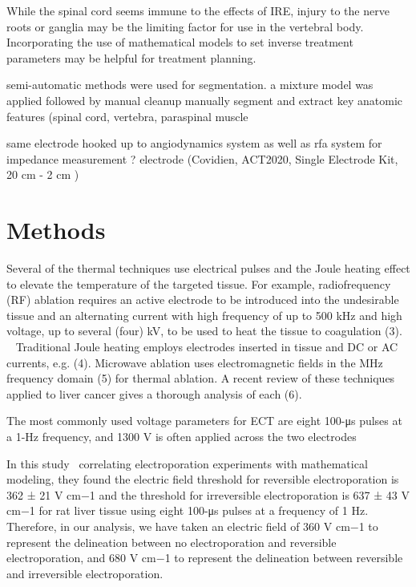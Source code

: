 \documentclass{article}
\begin{document}
While the spinal cord seems immune to the effects of IRE, injury to the
nerve roots or ganglia may be the limiting factor for use in the vertebral
body. Incorporating the use of mathematical models to set inverse treatment
parameters may be helpful for treatment planning.



semi-automatic methods were used for segmentation. 
a mixture model was applied followed by  manual cleanup
manually segment and
extract key anatomic features (spinal
cord, vertebra, paraspinal muscle



 
same electrode hooked up to angiodynamics system as well as rfa system for
impedance measurement ? 
electrode (Covidien, ACT2020, Single Electrode Kit, 20 cm - 2 cm )





\section{Methods}
{\color{red}

Several of the thermal techniques
use electrical pulses and the Joule heating effect to elevate the
temperature of
the targeted tissue. For example, radiofrequency (RF) ablation requires an
active electrode to be introduced into the undesirable tissue and an
alternating
current with high frequency of up to 500 kHz and high voltage, up to several
(four) kV, to be used to heat the tissue to coagulation (3). ~\cite{Davalos2005}
Traditional Joule heating
employs electrodes inserted in tissue and DC or AC currents, e.g. (4).
Microwave ablation uses electromagnetic fields in the MHz frequency domain
(5) for thermal ablation. A recent review of these techniques applied to
liver
cancer gives a thorough analysis of each (6).




The most commonly
used voltage parameters for ECT are eight 100-μs
pulses at a 1-Hz frequency, and 1300 V is often applied
across the two electrodes


In this study~\cite{Miklavcic2000} correlating electroporation experiments with
mathematical modeling, they found the electric field threshold
for reversible electroporation is 362 ± 21 V cm−1 and
the threshold for irreversible electroporation is 637 ± 43 V
cm−1 for rat liver tissue using eight 100-μs pulses at a frequency
of 1 Hz. Therefore, in our analysis, we have taken
an electric field of 360 V cm−1 to represent the delineation
between no electroporation and reversible electroporation,
and 680 V cm−1 to represent the delineation between reversible
and irreversible electroporation.

}
\end{document}
